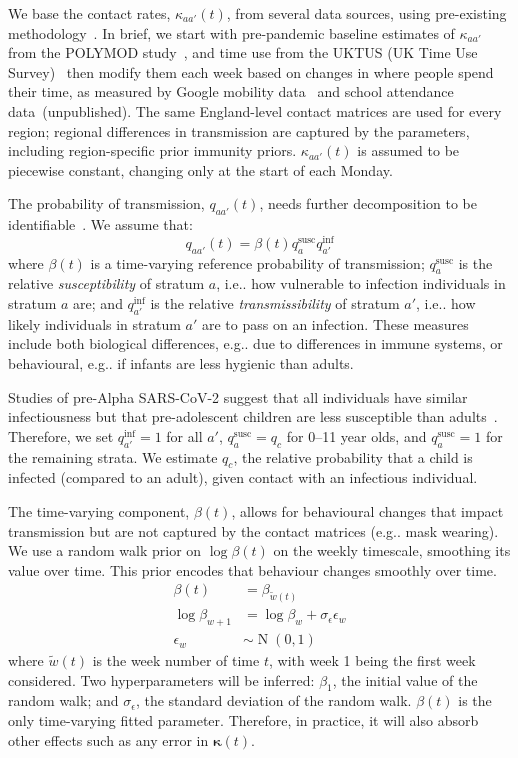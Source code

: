 \documentclass[9pt,twocolumn,twoside]{pnas-new}
\makeatletter
\DeclareMathOperator{\N}{N}
\newcommand\matr{\bm}
\DeclareRobustCommand\onedot{\futurelet\@let@token\@onedot}
\def\@onedot{\ifx\@let@token.\else.\null\fi\xspace}
\def\eg{e.g\onedot} \def\Eg{{E.g}\onedot}
\def\ie{i.e\onedot} \def\Ie{{I.e}\onedot}
\makeatother
\begin{document}
We base the contact rates, $\kappa_{aa'}(t)$, from several data sources, using pre-existing methodology~\citep{vanleeuwenAugmenting,birrellRealtime}.
In brief, we start with pre-pandemic baseline estimates of $\kappa_{aa'}$ from the POLYMOD study~\citep{mossongSocial}, and time use from the UKTUS (UK Time Use Survey)~\citep{UKTUS} then modify them each week based on changes in where people spend their time, as measured by Google mobility data~\citep{googleCOVID19} and school attendance data~(unpublished).
The same England-level contact matrices are used for every region; regional differences in transmission are captured by the parameters, including region-specific prior immunity priors.
$\kappa_{aa'}(t)$ is assumed to be piecewise constant, changing only at the start of each Monday.

The probability of transmission, $q_{aa'}(t)$, needs further decomposition to be identifiable~\citep{andersonInfectious}.
We assume that:
\begin{equation}
    q_{aa'}(t) = \beta(t) q^\text{susc}_{a} q^\text{inf}_{a'}
\end{equation}
where $\beta(t)$ is a time-varying reference probability of transmission; $q^\text{susc}_a$ is the relative \emph{susceptibility} of stratum $a$, \ie how vulnerable to infection individuals in stratum $a$ are; and $q^\text{inf}_{a'}$ is the relative \emph{transmissibility} of stratum $a'$, \ie how likely individuals in stratum $a'$ are to pass on an infection.
These measures include both biological differences, \eg due to differences in immune systems, or behavioural, \eg if infants are less hygienic than adults.

Studies of pre-Alpha SARS-CoV-2 suggest that all individuals have similar infectiousness but that pre-adolescent children are less susceptible than adults~\citep{chenRole,vinerTransmission}.
Therefore, we set $q^\text{inf}_{a'} = 1$ for all $a'$, $q^\text{susc}_{a} = q_c$ for 0--11 year olds, and $q^\text{susc}_{a} = 1$ for the remaining strata.
We estimate $q_c$, the relative probability that a child is infected (compared to an adult), given contact with an infectious individual.

The time-varying component, $\beta(t)$, allows for behavioural changes that impact transmission but are not captured by the contact matrices (\eg mask wearing).
We use a random walk prior on $\log\beta(t)$ on the weekly timescale, smoothing its value over time.
This prior encodes that behaviour changes smoothly over time.
\begin{align}
    \beta(t) &= \beta_{\tilde{w}(t)} \\
    \log\beta_{w+1} &= \log\beta_w + \sigma_\epsilon \epsilon_w \\
    \epsilon_w &\sim \N(0, 1)
\end{align}
where $\tilde{w}(t)$ is the week number of time $t$, with week 1 being the first week considered.
Two hyperparameters will be inferred: $\beta_1$, the initial value of the random walk; and $\sigma_\epsilon$, the standard deviation of the random walk.
$\beta(t)$ is the only time-varying fitted parameter.
Therefore, in practice, it will also absorb other effects such as any error in $\matr{\kappa}(t)$.
\end{document}
